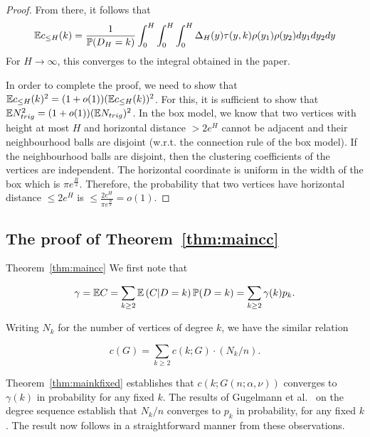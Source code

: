 \begin{proof}
From there, it follows that
\begin{align*}
\mathbb{E} c_{\leq H}(k) = \frac{1}{\mathbb{P}(D_H=k)} \int_0^H \int_0^H \int_0^H \Delta_{H}(y) \tau(y,k) \rho(y_1)\rho(y_2)dy_1dy_2 dy
\end{align*}
For $H\rightarrow \infty$, this converges to the integral obtained in the paper.

In order to complete the proof, we need to show that $\mathbb{E} c_{\leq H}(k)^2 = (1+o(1))(\mathbb{E} c_{\leq H}(k))^2$. For this, it is sufficient to show that $\mathbb{E} N_{trig}^2 = (1+o(1))(\mathbb{E} N_{trig})^2$. In the box model, we know that two vertices with height at most $H$ and horizontal distance $>2e^H$ cannot be adjacent and their neighbourhood balls are disjoint (w.r.t. the connection rule of the box model). If the neighbourhood balls are disjoint, then the clustering coefficients of the vertices are independent. The horizontal coordinate is uniform in the width of the box which is $\pi e^{\frac{R}{2}}$. Therefore, the probability that two vertices have horizontal distance $\leq 2e^H$ is $\leq \frac{2e^H}{\pi e^{\frac{R}{2}}} = o(1)$.
\end{proof}



\subsection{The proof of Theorem~\ref{thm:maincc}}



\begin{proofof}{Theorem~\ref{thm:maincc}}
We first note that

$$ \gamma = {\mathbb E} C = \sum_{k\geq 2} {\mathbb E}\left( C | D=k \right) \mathbb{P}( D=k ) = \sum_{k\geq 2} \gamma(k) p_k. $$

Writing $N_k$ for the number of vertices of degree $k$, we have the similar relation

$$ c(G) = \sum_{k\geq 2} c(k;G) \cdot (N_k/n). $$

Theorem~\ref{thm:mainkfixed} establishes that $c(k;G(n;\alpha,\nu))$ converges to $\gamma(k)$ in probability 
for any fixed $k$. The results of Gugelmann et al.~\cite{gugelmann2012random} on the degree sequence establish 
that $N_k/n$ converges to $p_k$ in probability, for any fixed $k$.
The result now follows in a straightforward manner from these observations.
\end{proofof}
